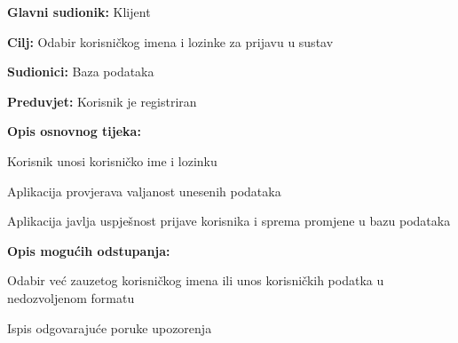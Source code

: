 			\noindent {}
		\begin{packed_item}
			
			\item \textbf{Glavni sudionik: }Klijent
			\item  \textbf{Cilj:} Odabir korisničkog imena i lozinke za prijavu u sustav
			\item  \textbf{Sudionici:} Baza podataka
			\item  \textbf{Preduvjet:} Korisnik je registriran
			\item  \textbf{Opis osnovnog tijeka:}
			
			\item[] \begin{packed_enum}
				
			
				\item Korisnik unosi korisničko ime i lozinku
				\item Aplikacija provjerava valjanost unesenih podataka
				\item Aplikacija javlja uspješnost prijave korisnika i sprema promjene u bazu podataka
				
			\end{packed_enum}
			
			\item  \textbf{Opis mogućih odstupanja:}
			
			\item[] \begin{packed_item}
				
				\item[2.a] Odabir već zauzetog korisničkog imena ili unos korisničkih podatka u nedozvoljenom formatu 
				\item[] \begin{packed_enum}
					
					\item Ispis odgovarajuće poruke upozorenja
					
					
				\end{packed_enum}
				
				
			\end{packed_item}
			
			
			
			
		\end{packed_item}
		
			
			
			
				

				
				
